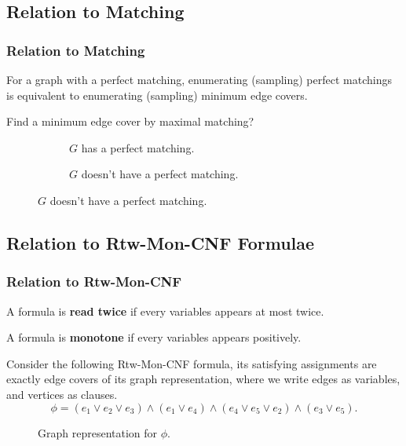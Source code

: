 \documentclass[mathserif]{beamer}
\begin{document}
\subsection{Relation to Matching}
\begin{frame}
	\frametitle{Relation to Matching}
For a graph with a perfect matching, enumerating (sampling) perfect matchings is equivalent to enumerating (sampling) minimum edge covers.
	\begin{example}
		Find a minimum edge cover by maximal matching?
		\begin{figure}[htp]
			\begin{subfigure}[b]{0.49\textwidth}
				\centering
				
				\caption{$G$ has a perfect matching.}
			\end{subfigure}
			\hfill
			\begin{subfigure}[b]{0.49\textwidth}
				\centering
				

				\caption{$G$ doesn't have a perfect matching.}
			\end{subfigure}
		\end{figure}
	\end{example}
\end{frame}

\subsection{Relation to Rtw-Mon-CNF Formulae}
\begin{frame}
	\frametitle{Relation to Rtw-Mon-CNF}
    \begin{definition}
        A formula is {\bf read twice} if every variables appears at most twice.
        
        A formula is {\bf monotone} if every variables appears positively.
    \end{definition}
    \pause
	Consider the following Rtw-Mon-CNF formula, its satisfying assignments are exactly edge covers of its graph representation, where we write edges as variables, and vertices as clauses.
	\[
		\phi = (e_1 \vee e_2 \vee e_3) \wedge (e_1 \vee e_4) \wedge (e_4 \vee e_5 \vee e_2 ) \wedge (e_3 \vee e_5).
	\]

	\begin{figure}[htp]
		\centering
		
		\caption{Graph representation for $\phi$.}
	\end{figure}
\end{frame}
\end{document}
